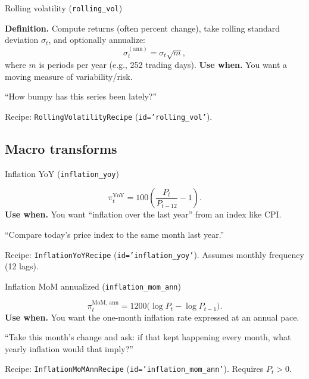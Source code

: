 \documentclass[11pt]{article}
\begin{document}
\begin{ConceptBox}{Rolling volatility (\texttt{rolling\_vol})}
\begin{ClassroomBox}
\textbf{Definition.} Compute returns (often percent change), take rolling standard deviation \(\sigma_t\), and optionally annualize:
\[
\sigma^{(\text{ann})}_t=\sigma_t\sqrt{m},
\]
where \(m\) is periods per year (e.g., 252 trading days).
\textbf{Use when.} You want a moving measure of variability/risk.
\end{ClassroomBox}
\begin{IntuitionBox}
“How bumpy has this series been lately?”
\end{IntuitionBox}
\begin{WhereBox}
Recipe: \texttt{RollingVolatilityRecipe} (\texttt{id='rolling\_vol'}).
\end{WhereBox}
\end{ConceptBox}

\subsection{Macro transforms}

\begin{ConceptBox}{Inflation YoY (\texttt{inflation\_yoy})}
\begin{ClassroomBox}
\[
\pi^{\text{YoY}}_t = 100\left(\frac{P_t}{P_{t-12}}-1\right).
\]
\textbf{Use when.} You want “inflation over the last year” from an index like CPI.
\end{ClassroomBox}
\begin{IntuitionBox}
“Compare today’s price index to the same month last year.”
\end{IntuitionBox}
\begin{WhereBox}
Recipe: \texttt{InflationYoYRecipe} (\texttt{id='inflation\_yoy'}). Assumes monthly frequency (12 lags).
\end{WhereBox}
\end{ConceptBox}

\begin{ConceptBox}{Inflation MoM annualized (\texttt{inflation\_mom\_ann})}
\begin{ClassroomBox}
\[
\pi^{\text{MoM, ann}}_t = 1200\big(\log P_t-\log P_{t-1}\big).
\]
\textbf{Use when.} You want the one-month inflation rate expressed at an annual pace.
\end{ClassroomBox}
\begin{IntuitionBox}
“Take this month’s change and ask: if that kept happening every month, what yearly inflation would that imply?”
\end{IntuitionBox}
\begin{WhereBox}
Recipe: \texttt{InflationMoMAnnRecipe} (\texttt{id='inflation\_mom\_ann'}). Requires \(P_t>0\).
\end{WhereBox}
\end{ConceptBox}
\end{document}
